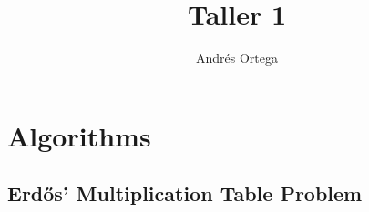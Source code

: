 \documentclass[12pt]{article}
\newcommand{\<}{\langle}
\renewcommand{\>}{\rangle}
\renewcommand{\(}{\left(}
\renewcommand{\)}{\right)}
\begin{document}
\title{Taller 1}
\author{Andrés Ortega}
\date{}

\maketitle

\section{Algorithms}
\subsection{Erdős' Multiplication Table Problem}
\inputminted[linenos, frame=lines]{python}{code/erdos_multiplication_table.py}
\end{document}
